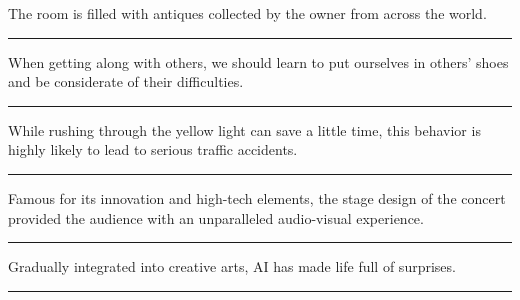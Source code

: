 \documentclass[11pt,a4paper]{article}
\newcommand{\num}[1]{\makebox[1.9em][r]{#1.}\hspace{0.3em}}
\newcommand{\wline}{\noindent\rule{\linewidth}{0.4pt}}
\begin{document}
\vspace{0.35em}\vspace{0.15em}

\begin{minipage}{\linewidth}

\num{9}The room is filled with antiques collected by the owner from across the world.

\vspace{0.25em}

\wline

\end{minipage}

\begin{minipage}{\linewidth}

\num{10}When getting along with others, we should learn to put ourselves in others’ shoes and be considerate of their difficulties.

\vspace{0.25em}

\wline

\end{minipage}

\begin{minipage}{\linewidth}

\num{11}While rushing through the yellow light can save a little time, this behavior is highly likely to lead to serious traffic accidents.

\vspace{0.25em}

\wline

\end{minipage}

\begin{minipage}{\linewidth}

\num{12}Famous for its innovation and high-tech elements, the stage design of the concert provided the audience with an unparalleled audio-visual experience.

\vspace{0.25em}

\wline

\end{minipage}

\vspace{0.35em}\vspace{0.15em}

\begin{minipage}{\linewidth}

\num{13}Gradually integrated into creative arts, AI has made life full of surprises.

\vspace{0.25em}

\wline

\end{minipage}
\end{document}
